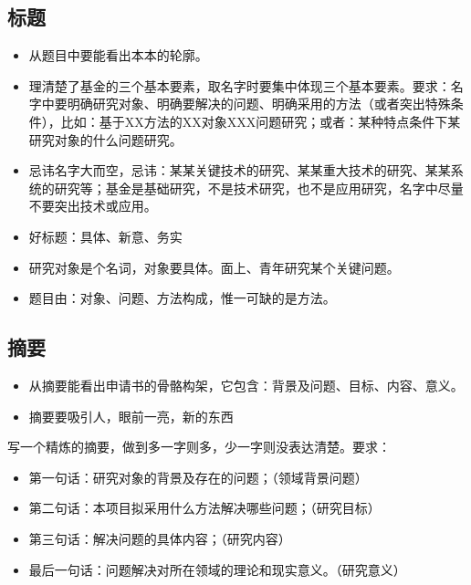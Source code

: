 \subsection{标题}
\begin{itemize}
\item {\color{red} 从题目中要能看出本本的轮廓。}

\item 理清楚了基金的三个基本要素，取名字时要集中体现三个基本要素。要求：名字中要明确研究对象、明确要解决的问题、明确采用的方法（或者突出特殊条件），比如：基于XX方法的XX对象XXX问题研究；或者：某种特点条件下某研究对象的什么问题研究。

\item 忌讳名字大而空，忌讳：某某关键技术的研究、某某重大技术的研究、某某系统的研究等；基金是基础研究，不是技术研究，也不是应用研究，名字中尽量不要突出技术或应用。

\item 好标题：具体、新意、务实

\item 研究对象是个名词，对象要具体。面上、青年研究某个关键问题。

\item 题目由：对象、问题、方法构成，惟一可缺的是方法。
\end{itemize}




\subsection{摘要}
\begin{itemize}
\item {\color{red}从摘要能看出申请书的骨骼构架，它包含：背景及问题、目标、内容、意义。}
\item 摘要要吸引人，眼前一亮，新的东西
\end{itemize}

写一个精炼的摘要，做到多一字则多，少一字则没表达清楚。要求：
\begin{itemize}
\item 第一句话：研究对象的背景及存在的问题；（领域背景问题）
\item 第二句话：本项目拟采用什么方法解决哪些问题；（研究目标）
\item 第三句话：解决问题的具体内容；（研究内容）
\item 最后一句话：问题解决对所在领域的理论和现实意义。（研究意义）
\end{itemize}

